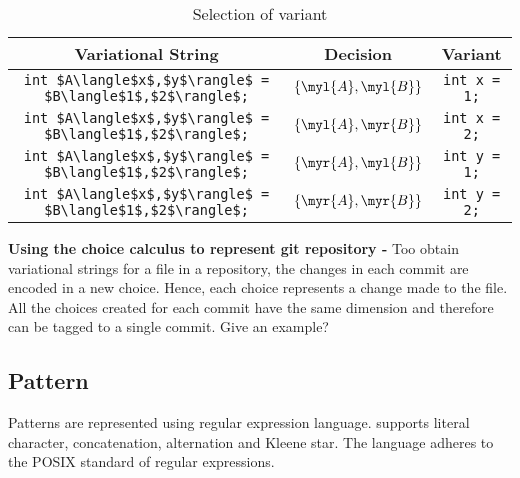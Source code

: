 \begin{table}
    \caption{Selection of variant}\label{tab:cem1}
    \begin{center}
        \begin{tabular}{|c|c|c|}
            \hline
            Variational String & Decision & Variant \\ \hline
            \lstinline|int $A\langle$x$,$y$\rangle$ = $B\langle$1$,$2$\rangle$;| & $\lbrace\myl{A},\myl{B}\rbrace$ & \lstinline|int x = 1;| \\
            \lstinline|int $A\langle$x$,$y$\rangle$ = $B\langle$1$,$2$\rangle$;| & $\lbrace\myl{A},\myr{B}\rbrace$ & \lstinline|int x = 2;| \\
            \lstinline|int $A\langle$x$,$y$\rangle$ = $B\langle$1$,$2$\rangle$;| & $\lbrace\myr{A},\myl{B}\rbrace$ & \lstinline|int y = 1;| \\
            \lstinline|int $A\langle$x$,$y$\rangle$ = $B\langle$1$,$2$\rangle$;| & $\lbrace\myr{A},\myr{B}\rbrace$ & \lstinline|int y = 2;| \\ \hline
        \end{tabular}
    \end{center}
\end{table}

\textbf{Using the choice calculus to represent git repository - } Too obtain variational strings for a file in a repository, the changes in each commit are encoded in a new choice. Hence, each choice represents a change made to the file. All the choices created for each commit have the same dimension and therefore can be tagged to a single commit.
{\info Give an example?}
\subsection{Pattern}\label{ssec:vp}
   Patterns are represented using regular expression language. \gql supports literal character, concatenation, alternation and Kleene star{}. The language adheres to the POSIX standard of regular expressions. 

